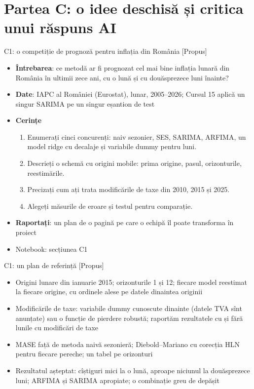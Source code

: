 \section{Partea C: o idee deschisă și critica unui răspuns AI}

\begin{frame}{C1: o competiție de prognoză pentru inflația din România [Propus]}
\itemsize{\footnotesize}
\begin{itemize}
\item \textbf{Întrebarea}: ce metodă ar fi prognozat cel mai bine inflația lunară din România în ultimii zece ani, cu o lună și cu douăsprezece luni înainte?
\item \textbf{Date}: IAPC al României (Eurostat), lunar, 2005--2026; Cursul 15 aplică un singur SARIMA pe un singur eșantion de test
\item \textbf{Cerințe}
\begin{enumerate}
    \item Enumerați cinci concurenți: naiv sezonier, SES, SARIMA, ARFIMA, un model ridge cu decalaje și variabile dummy pentru luni.
    \item Descrieți o schemă cu origini mobile: prima origine, pasul, orizonturile, reestimările.
    \item Precizați cum ați trata modificările de taxe din 2010, 2015 și 2025.
    \item Alegeți măsurile de eroare și testul pentru comparație.
\end{enumerate}
\item \textbf{Raportați}: un plan de o pagină pe care o echipă îl poate transforma în proiect
\item Notebook: secțiunea C1
\end{itemize}
\end{frame}

\ifsolutions
\begin{frame}{C1: un plan de referință [Propus]}
\itemsize{\footnotesize}
\begin{itemize}
    \item Origini lunare din ianuarie 2015; orizonturile 1 și 12; fiecare model reestimat la fiecare origine, cu ordinele alese pe datele dinaintea originii
    \item Modificările de taxe: variabile dummy cunoscute dinainte (datele TVA sînt anunțate) sau o funcție de pierdere robustă; raportăm rezultatele cu și fără lunile cu modificări de taxe
    \item MASE față de metoda naivă sezonieră; Diebold--Mariano cu corecția HLN pentru fiecare pereche; un tabel pe orizonturi
    \item Rezultatul așteptat: cîștiguri mici la o lună, aproape niciunul la douăsprezece luni; ARFIMA și SARIMA apropiate; o combinație greu de depășit
\end{itemize}
\end{frame}
\fi

